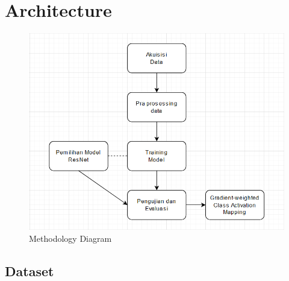 \section{Architecture}
\label{sec:architecture}

\begin{figure}[hbtp] \centering
	\includegraphics[scale=0.4]{gambar/diagramMethod.png}
	\caption{Methodology Diagram}
	\label{fig:diagramMethod}
\end{figure}

\subsection{Dataset}
\label{subsec:dataset}

